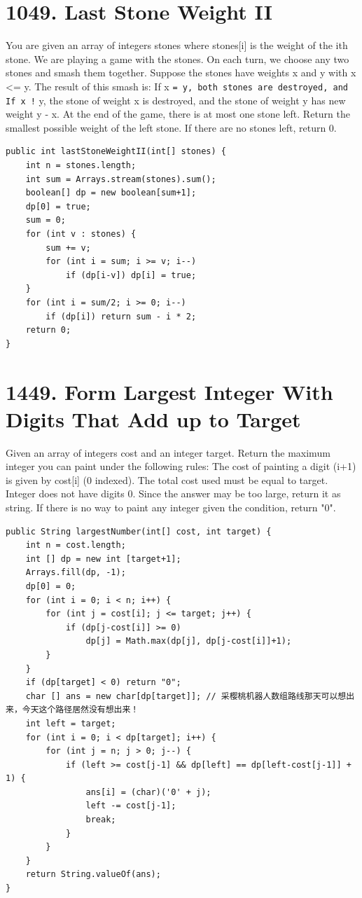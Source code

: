 \documentclass[9pt, b5paaper]{book}
\begin{document}
\section{1049. Last Stone Weight II}
\label{sec-2-28}
You are given an array of integers stones where stones[i] is the weight of the ith stone.
We are playing a game with the stones. On each turn, we choose any two stones and smash them together. Suppose the stones have weights x and y with x <= y. The result of this smash is:
If x \texttt{= y, both stones are destroyed, and
If x !} y, the stone of weight x is destroyed, and the stone of weight y has new weight y - x.
At the end of the game, there is at most one stone left.
Return the smallest possible weight of the left stone. If there are no stones left, return 0.
\begin{verbatim}
public int lastStoneWeightII(int[] stones) {
    int n = stones.length;
    int sum = Arrays.stream(stones).sum();
    boolean[] dp = new boolean[sum+1];
    dp[0] = true;
    sum = 0;
    for (int v : stones) {
        sum += v;
        for (int i = sum; i >= v; i--) 
            if (dp[i-v]) dp[i] = true;
    }
    for (int i = sum/2; i >= 0; i--) 
        if (dp[i]) return sum - i * 2;
    return 0;
}
\end{verbatim}

\section{1449. Form Largest Integer With Digits That Add up to Target}
\label{sec-2-29}
Given an array of integers cost and an integer target. Return the maximum integer you can paint under the following rules:
The cost of painting a digit (i+1) is given by cost[i] (0 indexed).
The total cost used must be equal to target.
Integer does not have digits 0.
Since the answer may be too large, return it as string.
If there is no way to paint any integer given the condition, return "0".
\begin{verbatim}
public String largestNumber(int[] cost, int target) { 
    int n = cost.length;
    int [] dp = new int [target+1];
    Arrays.fill(dp, -1);
    dp[0] = 0;
    for (int i = 0; i < n; i++) {
        for (int j = cost[i]; j <= target; j++) {
            if (dp[j-cost[i]] >= 0)
                dp[j] = Math.max(dp[j], dp[j-cost[i]]+1);
        }
    }
    if (dp[target] < 0) return "0";
    char [] ans = new char[dp[target]]; // 采樱桃机器人数组路线那天可以想出来，今天这个路径居然没有想出来！
    int left = target;
    for (int i = 0; i < dp[target]; i++) {
        for (int j = n; j > 0; j--) {
            if (left >= cost[j-1] && dp[left] == dp[left-cost[j-1]] + 1) {
                ans[i] = (char)('0' + j);
                left -= cost[j-1];
                break;
            }
        }
    }
    return String.valueOf(ans);
}
\end{verbatim}
\end{document}
